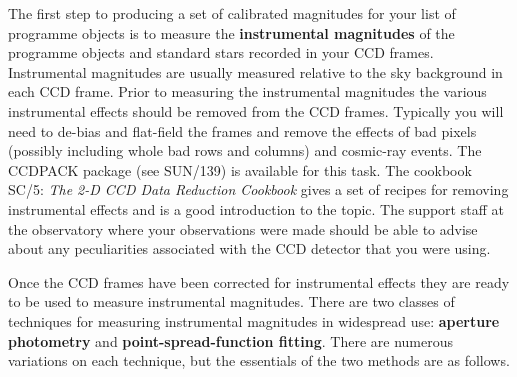 \documentclass[twoside,11pt]{article}
\newcommand{\xref}[3]{#1}
\begin{document}
The first step to producing a set of calibrated magnitudes for your
list of programme objects is to measure the {\bf instrumental
magnitudes} of the programme objects and standard stars recorded in
your CCD frames.  Instrumental magnitudes are usually measured relative
to the sky background in each CCD frame.  Prior to measuring the
instrumental magnitudes the various instrumental effects should be
removed from the CCD frames.  Typically you will need to de-bias and
flat-field the frames and remove the effects of bad pixels (possibly
including whole bad rows and columns) and cosmic-ray events.  The
CCDPACK package (see \xref{SUN/139}{sun139}{}\cite{SUN139}) is available
for this task.  The cookbook \xref{SC/5: {\it The 2-D CCD Data Reduction
Cookbook}}{sc5}{}\/\cite{SC5} gives a set of recipes for removing
instrumental effects and is a good introduction to the topic.  The support
staff at the observatory where your observations were made should be able
to advise about any peculiarities associated with the CCD detector that
you were using.

Once the CCD frames have been corrected for instrumental effects they
are ready to be used to measure instrumental magnitudes.  There are
two classes of techniques for measuring instrumental magnitudes in
widespread use: {\bf aperture photometry} and {\bf point-spread-function
fitting}.  There are numerous variations on each technique, but the
essentials of the two methods are as follows.
\end{document}
